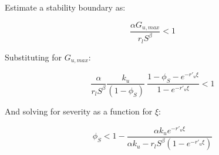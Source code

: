 \documentclass{article}
\begin{document}
Estimate a stability boundary as:


\begin{equation}
\frac{\alpha G_{u,max}}{r_l S^\beta} < 1
\end{equation}

Substituting for $G_{u,max}$:

\begin{equation}
\frac{\alpha }{r_l S^\beta} \frac{ k_u}{(1-\phi_S)} \   \frac{1- \phi_S - e^{-r'_u \xi} }{1 - e^{-r'_u \xi}} < 1
\end{equation}

And solving for severity as a function for $\xi$:


\begin{equation}
\phi_S < 1 - \frac{\alpha k_u e^{-r'_u \xi }}{\alpha k_u - r_l S^\beta (1- e^{-r'_u \xi })}
\end{equation}



\newpage



\end{document}
